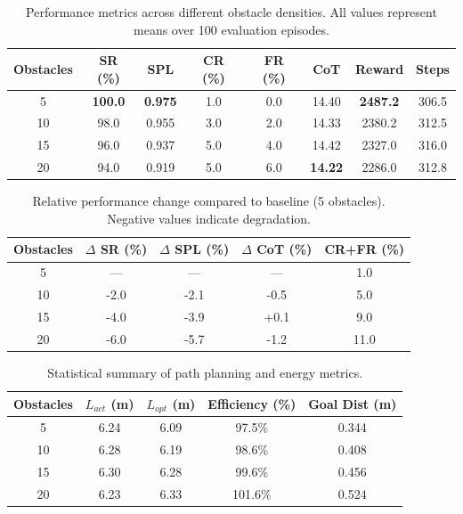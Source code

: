 \begin{table}[htbp]
\centering
\caption{Performance metrics across different obstacle densities. All values represent means over 100 evaluation episodes.}
\label{tab:main_results}
\begin{tabular}{cccccccc}
\toprule
\textbf{Obstacles} & \textbf{SR (\%)} & \textbf{SPL} & \textbf{CR (\%)} & \textbf{FR (\%)} & \textbf{CoT} & \textbf{Reward} & \textbf{Steps} \\
\midrule
5 & \textbf{100.0} & \textbf{0.975} & 1.0 & 0.0 & 14.40 & \textbf{2487.2} & 306.5 \\
10 & 98.0 & 0.955 & 3.0 & 2.0 & 14.33 & 2380.2 & 312.5 \\
15 & 96.0 & 0.937 & 5.0 & 4.0 & 14.42 & 2327.0 & 316.0 \\
20 & 94.0 & 0.919 & 5.0 & 6.0 & \textbf{14.22} & 2286.0 & 312.8 \\
\bottomrule
\end{tabular}
\end{table}


\begin{table}[htbp]
\centering
\caption{Relative performance change compared to baseline (5 obstacles). Negative values indicate degradation.}
\label{tab:comparison}
\begin{tabular}{ccccc}
\toprule
\textbf{Obstacles} & \textbf{$\Delta$ SR (\%)} & \textbf{$\Delta$ SPL (\%)} & \textbf{$\Delta$ CoT (\%)} & \textbf{CR+FR (\%)} \\
\midrule
5 & --- & --- & --- & 1.0 \\
10 & -2.0 & -2.1 & -0.5 & 5.0 \\
15 & -4.0 & -3.9 & +0.1 & 9.0 \\
20 & -6.0 & -5.7 & -1.2 & 11.0 \\
\bottomrule
\end{tabular}
\end{table}


\begin{table}[htbp]
\centering
\caption{Statistical summary of path planning and energy metrics.}
\label{tab:statistics}
\begin{tabular}{ccccc}
\toprule
\textbf{Obstacles} & \textbf{$L_{act}$ (m)} & \textbf{$L_{opt}$ (m)} & \textbf{Efficiency (\%)} & \textbf{Goal Dist (m)} \\
\midrule
5 & 6.24 & 6.09 & 97.5\% & 0.344 \\
10 & 6.28 & 6.19 & 98.6\% & 0.408 \\
15 & 6.30 & 6.28 & 99.6\% & 0.456 \\
20 & 6.23 & 6.33 & 101.6\% & 0.524 \\
\bottomrule
\end{tabular}
\end{table}


